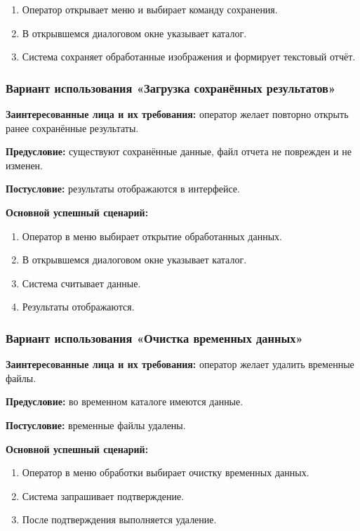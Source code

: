 \begin{enumerate}
	\item Оператор открывает меню и выбирает команду сохранения.
	\item В открывшемся диалоговом окне указывает каталог.
	\item Система сохраняет обработанные изображения и формирует текстовый отчёт.
\end{enumerate}

\subsubsection{Вариант использования «Загрузка сохранённых результатов»}

\textbf{Заинтересованные лица и их требования:} оператор желает повторно открыть ранее сохранённые результаты.

\textbf{Предусловие:} существуют сохранённые данные, файл отчета не поврежден и не изменен.

\textbf{Постусловие:} результаты отображаются в интерфейсе.

\textbf{Основной успешный сценарий:}

\begin{enumerate}
	\item Оператор в меню выбирает открытие обработанных данных.
	\item В открывшемся диалоговом окне указывает каталог.
	\item Система считывает данные.
	\item Результаты отображаются.
\end{enumerate}

\subsubsection{Вариант использования «Очистка временных данных»}

\textbf{Заинтересованные лица и их требования:} оператор желает удалить временные файлы.

\textbf{Предусловие:} во временном каталоге имеются данные.

\textbf{Постусловие:} временные файлы удалены.

\textbf{Основной успешный сценарий:}

\begin{enumerate}
	\item Оператор в меню обработки выбирает очистку временных данных.
	\item Система запрашивает подтверждение.
	\item После подтверждения выполняется удаление.
\end{enumerate}

